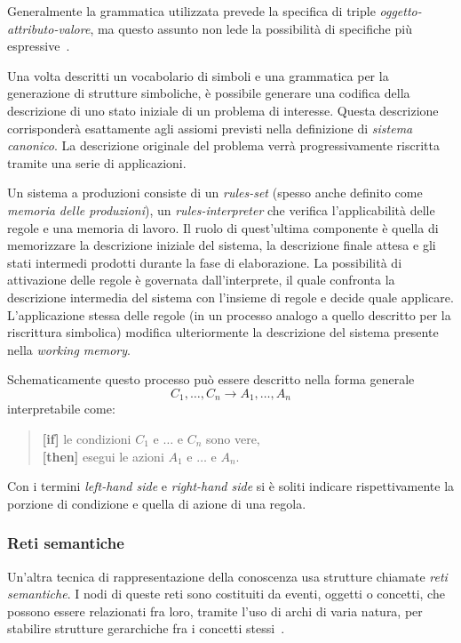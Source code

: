 Generalmente la grammatica utilizzata prevede la specifica di triple \emph{oggetto-attributo-valore}, ma questo assunto non lede la possibilità di specifiche più espressive~\cite{jackson1999}.

Una volta descritti un vocabolario di simboli e una grammatica per la generazione di strutture simboliche, è possibile generare una codifica della descrizione di uno stato iniziale di un problema di interesse. Questa descrizione corrisponderà esattamente agli assiomi previsti nella definizione di \emph{sistema canonico}. La descrizione originale del problema verrà progressivamente riscritta tramite una serie di applicazioni.

Un sistema a produzioni consiste di un \emph{rules-set} (spesso anche definito come \emph{memoria delle produzioni}), un \emph{rules-interpreter} che verifica l'applicabilità delle regole e una memoria di lavoro. Il ruolo di quest'ultima componente è quella di memorizzare la descrizione iniziale del sistema, la descrizione finale attesa e gli stati intermedi prodotti durante la fase di elaborazione. La possibilità di attivazione delle regole è governata dall'interprete, il quale confronta la descrizione intermedia del sistema con l'insieme di regole e decide quale applicare. L'applicazione stessa delle regole (in un processo analogo a quello descritto per la riscrittura simbolica) modifica ulteriormente la descrizione del sistema presente nella \emph{working memory}.

Schematicamente questo processo può essere descritto nella forma generale
\[
C_1, \dots, C_n \rightarrow A_1, \dots, A_n
\]
interpretabile come:
\begin{quote}
	{\bfseries [if]} le condizioni $C_1$ e $\dots$ e $C_n$ sono vere,\\
	{\bfseries [then]} esegui le azioni $A_1$ e $\dots$ e $A_n$.
\end{quote}

Con i termini \emph{left-hand side} e \emph{right-hand side} si è soliti indicare rispettivamente la porzione di condizione e quella di azione di una regola.

\subsubsection{Reti semantiche}
Un'altra tecnica di rappresentazione della conoscenza usa strutture chiamate \emph{reti semantiche}. I nodi di queste reti sono costituiti da eventi, oggetti o concetti, che possono essere relazionati fra loro, tramite l'uso di archi di varia natura, per stabilire strutture gerarchiche fra i concetti stessi~\cite{development1993}.

